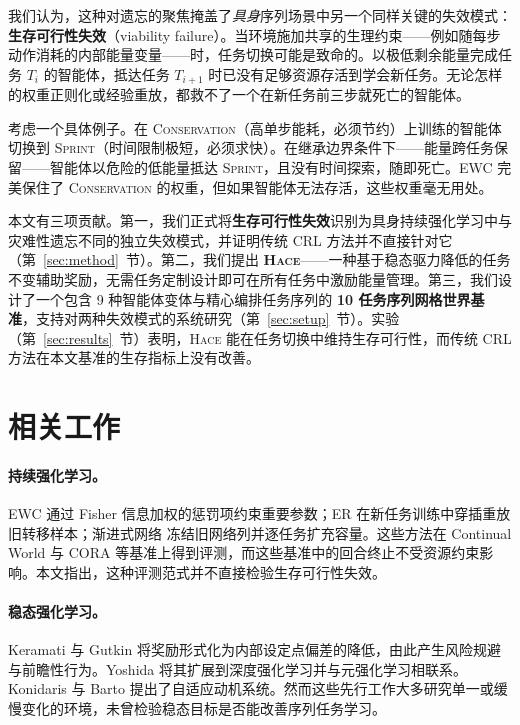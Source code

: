 \documentclass[zihao=5,a4paper,linespread=1.3,fontset=fandol]{ctexart}
\newcommand{\hace}{\textsc{Hace}}
\begin{document}
我们认为，这种对遗忘的聚焦掩盖了\emph{具身}序列场景中另一个同样关键的失效模式：\textbf{生存可行性失效}（viability failure）。当环境施加共享的生理约束——例如随每步动作消耗的内部能量变量——时，任务切换可能是致命的。以极低剩余能量完成任务 $T_i$ 的智能体，抵达任务 $T_{i+1}$ 时已没有足够资源存活到学会新任务。无论怎样的权重正则化或经验重放，都救不了一个在新任务前三步就死亡的智能体。

考虑一个具体例子。在 \textsc{Conservation}（高单步能耗，必须节约）上训练的智能体切换到 \textsc{Sprint}（时间限制极短，必须求快）。在继承边界条件下——能量跨任务保留——智能体以危险的低能量抵达 \textsc{Sprint}，且没有时间探索，随即死亡。EWC 完美保住了 \textsc{Conservation} 的权重，但如果智能体无法存活，这些权重毫无用处。

本文有三项贡献。第一，我们正式将\textbf{生存可行性失效}识别为具身持续强化学习中与灾难性遗忘不同的独立失效模式，并证明传统 CRL 方法并不直接针对它（第~\ref{sec:method}~节）。第二，我们提出 \textbf{\hace{}}——一种基于稳态驱力降低的任务不变辅助奖励，无需任务定制设计即可在所有任务中激励能量管理。第三，我们设计了一个包含 9 种智能体变体与精心编排任务序列的 \textbf{10 任务序列网格世界基准}，支持对两种失效模式的系统研究（第~\ref{sec:setup}~节）。实验（第~\ref{sec:results}~节）表明，\hace{} 能在任务切换中维持生存可行性，而传统 CRL 方法在本文基准的生存指标上没有改善。

\section{相关工作}
\label{sec:related}

\paragraph{持续强化学习。}
EWC\cite{kirkpatrick2017} 通过 Fisher 信息加权的惩罚项约束重要参数；ER\cite{rolnick2019} 在新任务训练中穿插重放旧转移样本；渐进式网络\cite{rusu2016} 冻结旧网络列并逐任务扩充容量。这些方法在 Continual World\cite{continualworld2021} 与 CORA\cite{cora2022} 等基准上得到评测，而这些基准中的回合终止不受资源约束影响。本文指出，这种评测范式并不直接检验生存可行性失效。

\paragraph{稳态强化学习。}
Keramati 与 Gutkin\cite{keramati2014} 将奖励形式化为内部设定点偏差的降低，由此产生风险规避与前瞻性行为。Yoshida\cite{yoshida2018,Yoshida} 将其扩展到深度强化学习并与元强化学习相联系。Konidaris 与 Barto\cite{konidaris2006} 提出了自适应动机系统。然而这些先行工作大多研究单一或缓慢变化的环境，未曾检验稳态目标是否能改善序列任务学习。
\end{document}
